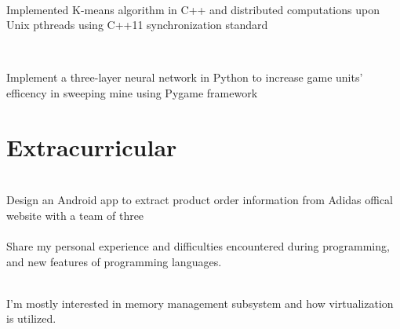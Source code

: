 \documentclass[]{deedy-resume-openfont}
\begin{document}
\hfill \\
\begin{tightemize}
	\item Implemented K-means algorithm in C++ and distributed computations upon Unix pthreads using C++11 synchronization standard
\end{tightemize}
\sectionsep

\\
\begin{tightemize}
	\item Implement a three-layer neural network in Python to increase game units' efficency in sweeping mine using Pygame framework\\
\end{tightemize}
\sectionsep
%
%
\section{Extracurricular}
\hfill {} \\
Design an Android app to extract product order information from Adidas offical website with a team of three\\
\sectionsep
{} \hfill {} \\
Share my personal experience and difficulties encountered during programming, and new features of programming languages.
\sectionsep

 \\
I'm mostly interested in memory management subsystem and how virtualization is utilized.\\
\end{document}
